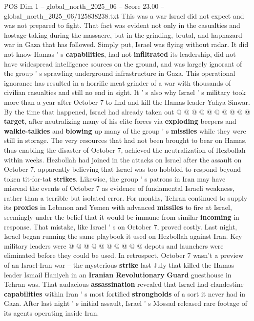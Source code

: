 \begin{textsample}{POS Dim 1 – global\_north\_2025\_06 – Score 23.00 – global\_north\_2025\_06/125838238.txt}
This was a war Israel did not expect and was not prepared to fight.
That fact was evident not only in the casualties and hostage-taking during the massacre, but in the grinding, brutal, and haphazard war in Gaza that has followed.
Simply put, Israel was flying without radar.
It did not know Hamas ' s \textbf{capabilities}, had not \textbf{infiltrated} its leadership, did not have widespread intelligence sources on the ground, and was largely ignorant of the group ' s sprawling underground infrastructure in Gaza.
This operational ignorance has resulted in a horrific meat grinder of a war with thousands of civilian casualties and still no end in sight.
It ' s also why Israel ' s military took more than a year after October 7 to find and kill the Hamas leader Yahya Sinwar.
By the time that happened, Israel had already taken out @ @ @ @ @ @ @ @ @ @ \textbf{target}, after neutralizing many of his elite forces via \textbf{exploding} beepers and \textbf{walkie-talkies} and \textbf{blowing} up many of the group ' s \textbf{missiles} while they were still in storage.
The very resources that had not been brought to bear on Hamas, thus enabling the disaster of October 7, achieved the neutralization of Hezbollah within weeks.
Hezbollah had joined in the attacks on Israel after the assault on October 7, apparently believing that Israel was too hobbled to respond beyond token tit-for-tat \textbf{strikes}.
Likewise, the group ' s patrons in Iran may have misread the events of October 7 as evidence of fundamental Israeli weakness, rather than a terrible but isolated error.
For months, Tehran continued to supply its \textbf{proxies} in Lebanon and Yemen with advanced \textbf{missiles} to fire at Israel, seemingly under the belief that it would be immune from similar \textbf{incoming} in response.
That mistake, like Israel ' s on October 7, proved costly.
Last night, Israel began running the same playbook it used on Hezbollah against Iran.
Key military leaders were @ @ @ @ @ @ @ @ @ @ depots and launchers were eliminated before they could be used.
In retrospect, October 7 wasn't a preview of an Israel-Iran war -- the mysterious \textbf{strike} last July that killed the Hamas leader Ismail Haniyeh in an \textbf{Iranian} \textbf{Revolutionary} \textbf{Guard} guesthouse in Tehran was.
That audacious \textbf{assassination} revealed that Israel had clandestine \textbf{capabilities} within Iran ' s most fortified \textbf{strongholds} of a sort it never had in Gaza.
After last night ' s initial assault, Israel ' s Mossad released rare footage of its agents operating inside Iran.

\end{textsample}
